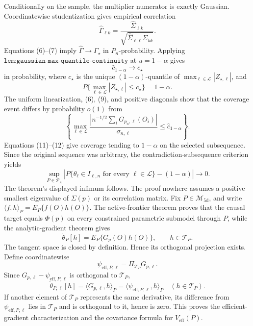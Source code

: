 Conditionally on the sample, the multiplier numerator is exactly Gaussian.  Coordinatewise studentization gives empirical correlation
\[
 \widehat\Gamma_{\ell k}
 =\frac{\widehat\Sigma_{\ell k}}
 {\sqrt{\widehat\Sigma_{\ell\ell}\widehat\Sigma_{kk}}}.  \tag{10}
\]
Equations (6)--(7) imply \(\widehat\Gamma\to\Gamma_\star\) in \(P_n\)-probability.  Applying \(\texttt{lem:gaussian-max-quantile-continuity}\) at \(u=1-\alpha\) gives
\[
 \widehat c_{1-\alpha}\longrightarrow c_\star             \tag{11}
\]
in probability, where \(c_\star\) is the unique \((1-\alpha)\)-quantile of \(\max_{\ell\in\mathcal L}|Z_{\star,\ell}|\), and
\[
 P\{\max_{\ell\in\mathcal L}|Z_{\star,\ell}|\leq c_\star\}=1-\alpha.                    \tag{12}
\]
The uniform linearization, (6), (9), and positive diagonals show that the coverage event differs by probability \(o(1)\) from
\[
 \left\{\max_{\ell\in\mathcal L}
 \frac{|n^{-1/2}\sum_iG_{p_n,\ell}(O_i)|}{\sigma_{n,\ell}}
 \leq\widehat c_{1-\alpha}\right\}.
\]
Equations (11)--(12) give coverage tending to \(1-\alpha\) on the selected subsequence.  Since the original sequence was arbitrary, the contradiction-subsequence criterion yields
\[
 \sup_{P\in\mathcal P_\kappa}
 \left|P\{\theta_\ell\in I_{\ell,n}\text{ for every }\ell\in\mathcal L\}-(1-\alpha)\right|
 \longrightarrow0.                                         \tag{13}
\]
The theorem's displayed infimum follows.  The proof nowhere assumes a positive smallest eigenvalue of \(\Sigma(p)\) or its correlation matrix.
Fix \(P\in\mathcal M_{\mathrm{5d}}\), and write \(\langle f,h\rangle_P=E_P\{f(O)h(O)\}\).  The active-frontier theorem proves that the causal target equals \(\Phi(p)\) on every constrained parametric submodel through \(P\), while the analytic-gradient theorem gives
\[
 \dot\theta_P[h]=E_P\{G_p(O)h(O)\},\qquad h\in\mathcal T_P.                                  \tag{1}
\]
The tangent space is closed by definition.  Hence its orthogonal projection exists.  Define coordinatewise
\[
 \psi_{\mathrm{eff},P,\ell}=\Pi_{\mathcal T_P}G_{p,\ell}.
\]
Since \(G_{p,\ell}-\psi_{\mathrm{eff},P,\ell}\) is orthogonal to \(\mathcal T_P\),
\[
 \dot\theta_{P,\ell}[h]
 =\langle G_{p,\ell},h\rangle_P
 =\langle\psi_{\mathrm{eff},P,\ell},h\rangle_P
 \quad(h\in\mathcal T_P).                                  \tag{2}
\]
If another element of \(\mathcal T_P\) represents the same derivative, its difference from \(\psi_{\mathrm{eff},P,\ell}\) lies in \(\mathcal T_P\) and is orthogonal to it, hence is zero.  This proves the efficient-gradient characterization and the covariance formula for \(V_{\mathrm{eff}}(P)\).

